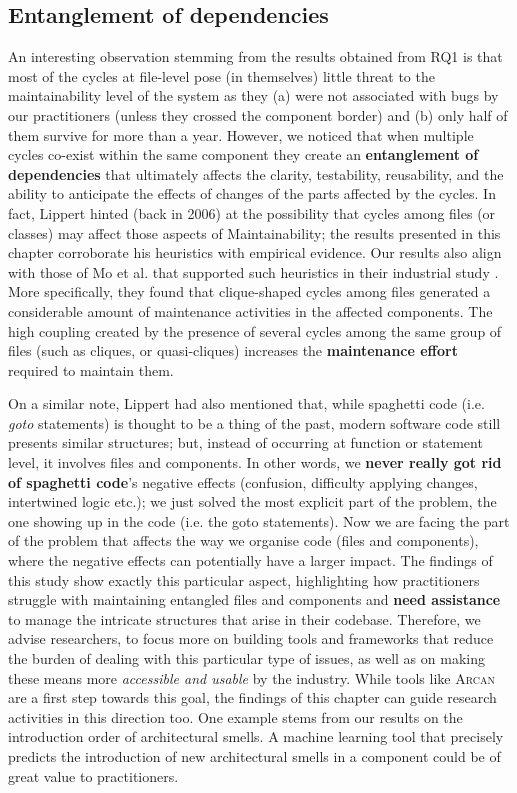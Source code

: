 \subsection{Entanglement of dependencies}
An interesting observation stemming from the results obtained from RQ1 is that most of the cycles at file-level pose (in themselves) little threat to the maintainability level of the system as they (a) were not associated with bugs by our practitioners (unless they crossed the component border) and (b) only half of them survive for more than a year.
However, we noticed that when multiple cycles co-exist within the same component they create an  \textbf{entanglement of dependencies} that ultimately affects the clarity, testability, reusability, and the ability to anticipate the effects of changes of the parts affected by the cycles.
In fact, Lippert \cite{Lippert2006} hinted (back in 2006) at the possibility that cycles among files (or classes) may affect those aspects of Maintainability; the results presented in this chapter corroborate his heuristics with empirical evidence.
Our results also align with those of Mo et al. that supported such heuristics in their industrial study \cite{Mo2018}.
More specifically, they found that clique-shaped cycles among files generated a considerable amount of maintenance activities in the affected components. 
The high coupling created by the presence of several cycles among the same group of files (such as cliques, or quasi-cliques) increases the \textbf{maintenance effort} required to maintain them.

On a similar note, Lippert had also mentioned that, while spaghetti code (i.e. \emph{goto} statements) is thought to be a thing of the past, modern software code still presents similar structures; but, instead of occurring at function or statement level, it involves files and components.
In other words, we \textbf{never really got rid of spaghetti code}'s negative effects (confusion, difficulty applying changes, intertwined logic etc.); we just solved the most explicit part of the problem, the one showing up in the code (i.e. the goto statements). 
Now we are facing the part of the problem that affects the way we organise code (files and components), where the negative effects can potentially have a larger impact.
The findings of this study show exactly this particular aspect, highlighting how practitioners struggle with maintaining entangled files and components and \textbf{need assistance} to manage the intricate structures that arise in their codebase.
Therefore, we advise researchers, to focus more on building tools and frameworks that reduce the burden of dealing with this particular type of issues, as well as on making these means more \emph{accessible and usable} by the industry.
While tools like \textsc{Arcan} are a first step towards this goal, the findings of this chapter can  guide research activities in this direction too.
One example stems from our results on the introduction order of architectural smells. A machine learning tool that precisely predicts the introduction of new architectural smells in a component could be of great value to practitioners.

